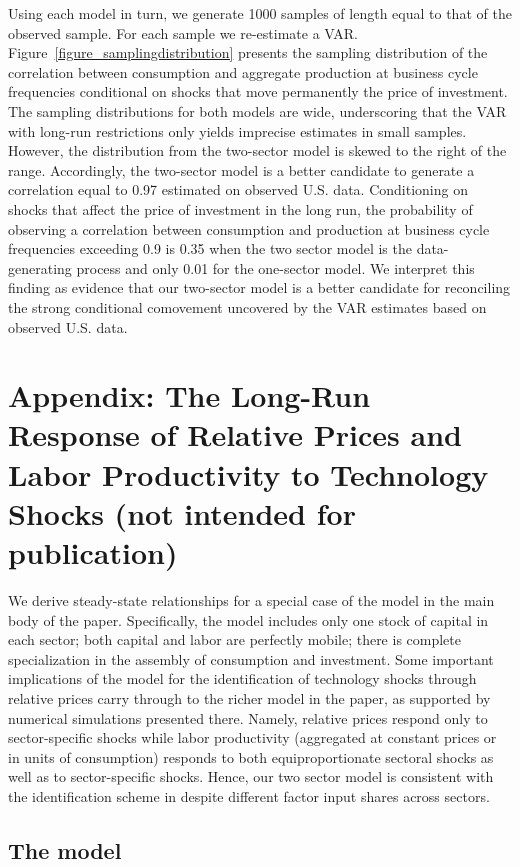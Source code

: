 \documentclass[12pt,fleqn]{article}
\begin{document}
{\normalsize Using each model in turn, we generate 1000 samples of length
equal to that of the observed sample. For each sample we re-estimate a VAR.
Figure~\ref{figure_samplingdistribution} presents the sampling distribution
of the correlation between consumption and aggregate production at business
cycle frequencies conditional on shocks that move permanently the price of
investment. The sampling distributions for both models are wide,
underscoring that the VAR with long-run restrictions only yields imprecise
estimates in small samples. However, the distribution from the two-sector
model is skewed to the right of the range. Accordingly, the two-sector model
is a better candidate to generate a correlation equal to 0.97 estimated on
observed U.S. data. Conditioning on shocks that affect the price of
investment in the long run, the probability of observing a correlation
between consumption and production at business cycle frequencies exceeding
0.9 is 0.35 when the two sector model is the data-generating process and
only 0.01 for the one-sector model. We interpret this finding as evidence
that our two-sector model is a better candidate for reconciling the strong
conditional comovement uncovered by the VAR estimates based on observed U.S.
data. }

\section{Appendix: The Long-Run Response of Relative Prices and Labor
Productivity to Technology Shocks (not intended for publication)}
\label{appendixb}

We derive steady-state relationships for a special case of the model
in the main body of the paper. Specifically, the model includes only
one stock of capital in each sector; both capital and labor are
perfectly mobile; there is complete specialization in the assembly
of consumption and investment. Some important implications of the
model for the identification of technology shocks through relative
prices carry through to the richer model in the paper, as supported
by numerical simulations presented there. Namely, relative prices
respond only to sector-specific shocks while labor productivity
(aggregated at constant prices or in units of consumption) responds
to both equiproportionate sectoral shocks as well as to
sector-specific shocks. Hence, our two sector model is consistent
with the identification scheme in  despite
different factor input shares across sectors.

\subsection{The model}
\end{document}

